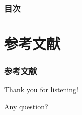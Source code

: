 \begin{frame}
  \frametitle{目次}

  \tableofcontents
\end{frame}

\section*{参考文献}
\begin{frame}
  \frametitle{参考文献}

  
  \nocite{*}
  
\end{frame}

\begin{frame}
  \centering
  {\Huge Thank you for listening!}

  \quad \quad

  {\Huge Any question?}
\end{frame}


